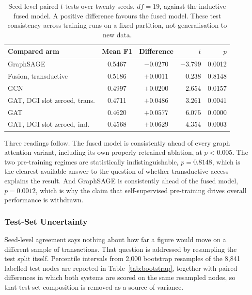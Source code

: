 \documentclass[12pt,a4paper]{article}
\begin{document}
\begin{table}[htbp]
\centering
\small
\caption{Seed-level paired $t$-tests over twenty seeds,
$df = 19$, against the inductive fused model. A positive
difference favours the fused model. These test consistency across
training runs on a fixed partition, not generalisation to new
data.}
\label{tab:stats}
\begin{tabular}{lccrr}
\toprule
Compared arm & Mean F1 & Difference & $t$ & $p$ \\
\midrule
GraphSAGE                    & 0.5467 & $-0.0270$ & $-3.799$ & 0.0012 \\
Fusion, transductive         & 0.5186 & $+0.0011$ & $0.238$  & 0.8148 \\
GCN                          & 0.4997 & $+0.0200$ & $2.654$  & 0.0157 \\
GAT, DGI slot zeroed, trans. & 0.4711 & $+0.0486$ & $3.261$  & 0.0041 \\
GAT                          & 0.4620 & $+0.0577$ & $6.075$  & 0.0000 \\
GAT, DGI slot zeroed, ind.   & 0.4568 & $+0.0629$ & $4.354$  & 0.0003 \\
\bottomrule
\end{tabular}
\end{table}

Three readings follow. The fused model is consistently ahead of
every graph attention variant, including its own properly
retrained ablation, at $p < 0.005$. The two pre-training regimes
are statistically indistinguishable, $p = 0.8148$, which is the
clearest available answer to the question of whether transductive
access explains the result. And GraphSAGE is consistently ahead
of the fused model, $p = 0.0012$, which is why the claim that
self-supervised pre-training drives overall performance is
withdrawn.

\subsubsection{Test-Set Uncertainty}

Seed-level agreement says nothing about how far a figure would
move on a different sample of transactions. That question is
addressed by resampling the test split itself. Percentile
intervals from 2{,}000 bootstrap resamples of the 8{,}841
labelled test nodes are reported in Table~\ref{tab:bootstrap},
together with paired differences in which both systems are scored
on the same resampled nodes, so that test-set composition is
removed as a source of variance.
\end{document}
